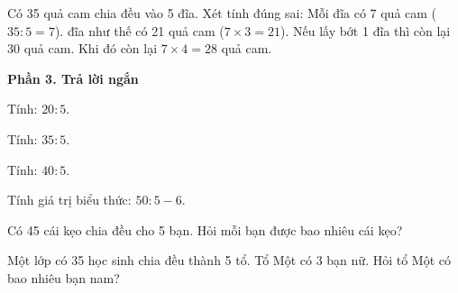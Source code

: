 \begin{ex} %
Có 35 quả cam chia đều vào 5 đĩa. Xét tính đúng sai:
\choiceTF
{\True Mỗi đĩa có 7 quả cam ($35 : 5 = 7$).}
{ đĩa như thế có 21 quả cam ($7 \times 3 = 21$).}
{Nếu lấy bớt 1 đĩa thì còn lại 30 quả cam.}
{\True Khi đó còn lại $7 \times 4 = 28$ quả cam.}
\end{ex}

\textbf{Phần 3. Trả lời ngắn}

\begin{ex} %
Tính: $20 : 5$.
\end{ex}

\begin{ex} %
Tính: $35 : 5$.
\end{ex}

\begin{ex} %
Tính: $40 : 5$.
\end{ex}

\begin{ex} %
Tính giá trị biểu thức: $50 : 5 - 6$.
\end{ex}

\begin{ex} %
Có 45 cái kẹo chia đều cho 5 bạn. Hỏi mỗi bạn được bao nhiêu cái kẹo?
\end{ex}

\begin{ex} %
Một lớp có 35 học sinh chia đều thành 5 tổ. Tổ Một có 3 bạn nữ. Hỏi tổ Một có bao nhiêu bạn nam?
\end{ex}
